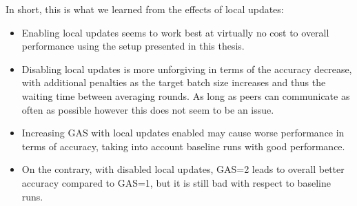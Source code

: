 In short, this is what we learned from the effects of local updates:
\begin{itemize}
    \item Enabling local updates seems to work best at virtually no cost to overall performance using the setup presented in this thesis.
    \item Disabling local updates is more unforgiving in terms of the accuracy decrease, with additional penalties as the target batch size increases and thus the waiting time between averaging rounds.
          As long as peers can communicate as often as possible however this does not seem to be an issue.
    \item Increasing GAS with local updates enabled may cause worse performance in terms of accuracy, taking into account baseline runs with good performance.
    \item On the contrary, with disabled local updates, GAS=2 leads to overall better accuracy compared to GAS=1, but it is still bad with respect to baseline runs.
\end{itemize}

